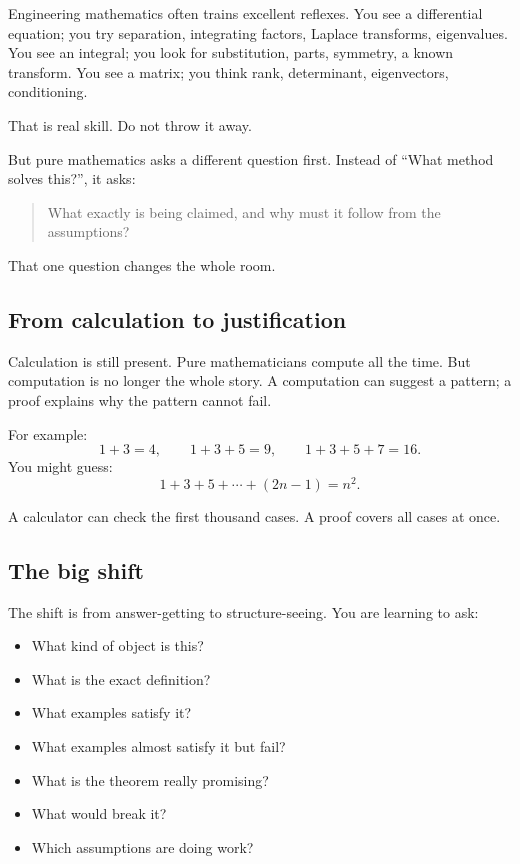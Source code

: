 \documentclass[11pt]{article}
\begin{document}
Engineering mathematics often trains excellent reflexes. You see a differential equation; you try separation, integrating factors, Laplace transforms, eigenvalues. You see an integral; you look for substitution, parts, symmetry, a known transform. You see a matrix; you think rank, determinant, eigenvectors, conditioning.

That is real skill. Do not throw it away.

But pure mathematics asks a different question first. Instead of ``What method solves this?'', it asks:

\begin{quote}
What exactly is being claimed, and why must it follow from the assumptions?
\end{quote}

That one question changes the whole room.

\subsection{From calculation to justification}

Calculation is still present. Pure mathematicians compute all the time. But computation is no longer the whole story. A computation can suggest a pattern; a proof explains why the pattern cannot fail.

For example:
\[
1+3=4,\qquad 1+3+5=9,\qquad 1+3+5+7=16.
\]
You might guess:
\[
1+3+5+\cdots+(2n-1)=n^2.
\]

A calculator can check the first thousand cases. A proof covers all cases at once.

\subsection{The big shift}

The shift is from answer-getting to structure-seeing. You are learning to ask:

\begin{itemize}
\item What kind of object is this?
\item What is the exact definition?
\item What examples satisfy it?
\item What examples almost satisfy it but fail?
\item What is the theorem really promising?
\item What would break it?
\item Which assumptions are doing work?
\end{itemize}
\end{document}
